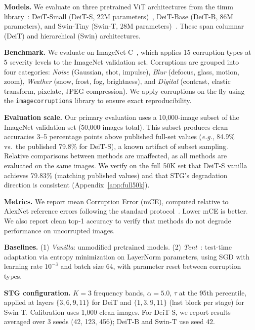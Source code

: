 \documentclass{article}
\newcommand{\eg}{\emph{e.g.}}
\begin{document}
\textbf{Models.} We evaluate on three pretrained ViT architectures from the timm library~\citep{rw2019timm}: DeiT-Small (DeiT-S, 22M parameters)~\citep{touvron2021training}, DeiT-Base (DeiT-B, 86M parameters), and Swin-Tiny (Swin-T, 28M parameters)~\citep{liu2021swin}. These span columnar (DeiT) and hierarchical (Swin) architectures.

\textbf{Benchmark.} We evaluate on ImageNet-C~\citep{hendrycks2019benchmarking}, which applies 15 corruption types at 5 severity levels to the ImageNet validation set. Corruptions are grouped into four categories: \emph{Noise} (Gaussian, shot, impulse), \emph{Blur} (defocus, glass, motion, zoom), \emph{Weather} (snow, frost, fog, brightness), and \emph{Digital} (contrast, elastic transform, pixelate, JPEG compression). We apply corruptions on-the-fly using the \texttt{imagecorruptions} library to ensure exact reproducibility.

\textbf{Evaluation scale.} Our primary evaluation uses a 10,000-image subset of the ImageNet validation set (50,000 images total). This subset produces clean accuracies 3--5 percentage points above published full-set values (\eg, 84.9\% vs.\ the published 79.8\% for DeiT-S), a known artifact of subset sampling. Relative comparisons between methods are unaffected, as all methods are evaluated on the same images. We verify on the full 50K set that DeiT-S vanilla achieves 79.83\% (matching published values) and that STG's degradation direction is consistent (Appendix~\ref{app:full50k}).

\textbf{Metrics.} We report mean Corruption Error (mCE), computed relative to AlexNet reference errors following the standard protocol~\citep{hendrycks2019benchmarking}. Lower mCE is better. We also report clean top-1 accuracy to verify that methods do not degrade performance on uncorrupted images.

\textbf{Baselines.} (1) \emph{Vanilla}: unmodified pretrained models. (2) \emph{Tent}~\citep{wang2021tent}: test-time adaptation via entropy minimization on LayerNorm parameters, using SGD with learning rate $10^{-3}$ and batch size 64, with parameter reset between corruption types.

\textbf{STG configuration.} $K{=}3$ frequency bands, $\alpha{=}5.0$, $\tau$ at the 95th percentile, applied at layers $\{3,6,9,11\}$ for DeiT and $\{1,3,9,11\}$ (last block per stage) for Swin-T. Calibration uses 1,000 clean images. For DeiT-S, we report results averaged over 3 seeds (42, 123, 456); DeiT-B and Swin-T use seed 42.
\end{document}
